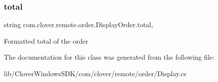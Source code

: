 \subsubsection{\texorpdfstring{total}{total}}
{\footnotesize\ttfamily string com.\+clover.\+remote.\+order.\+Display\+Order.\+total\hspace{0.3cm}{\ttfamily [get]}, {\ttfamily [set]}}

Formatted total of the order 

The documentation for this class was generated from the following file\+:\begin{DoxyCompactItemize}
\item 
lib/\+Clover\+Windows\+S\+D\+K/com/clover/remote/order/Display.\+cs\end{DoxyCompactItemize}
